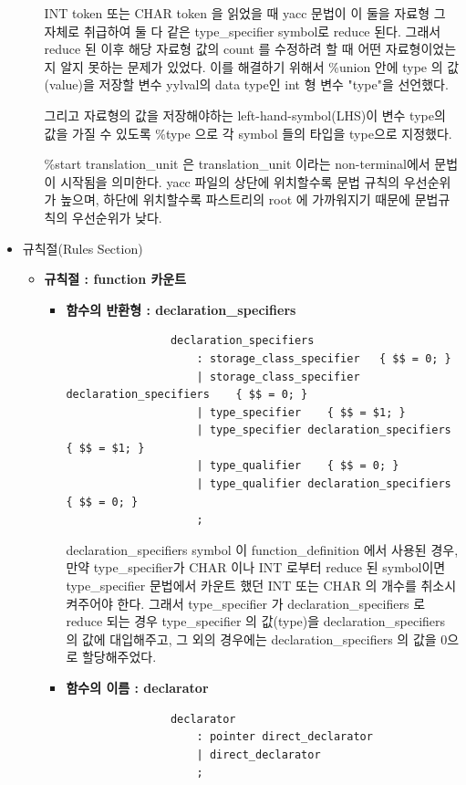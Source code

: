 \documentclass{article}
\begin{document}
\begin{itemize}
\begin{itemize}
		\vspace{3mm}
		INT token 또는 CHAR token 을 읽었을 때 yacc 문법이 이 둘을 자료형 그 자체로 취급하여
		둘 다 같은 type\_specifier symbol로 reduce 된다. 그래서 reduce 된 이후 해당 자료형 값의 count 를 수정하려 할 때
		어떤 자료형이었는지 알지 못하는 문제가 있었다. 이를 해결하기 위해서 \%union 안에 type 의 값(value)을 저장할
		변수 yylval의 data type인 int 형 변수 "type"을 선언했다.

		\vspace{3mm}
		그리고 자료형의 값을 저장해야하는 left-hand-symbol(LHS)이 변수 type의 값을 가질 수 있도록
		\%type 으로 각 symbol 들의 타입을 type으로 지정했다.

		\vspace{3mm}
		\%start translation\_unit 은 translation\_unit 이라는 non-terminal에서 문법이 시작됨을 의미한다.
		yacc 파일의 상단에 위치할수록 문법 규칙의 우선순위가 높으며, 하단에 위치할수록 파스트리의 root 에 가까워지기
		때문에 문법규칙의 우선순위가 낮다.
	\end{itemize}

	\item 규칙절(Rules Section)	
	\begin{itemize}
		\item {\bf 규칙절 : function 카운트}
		\begin{itemize}
			\item {\bf 함수의 반환형 : declaration\_specifiers}
			\begin{lstlisting}
				declaration_specifiers
					: storage_class_specifier	{ $$ = 0; }
					| storage_class_specifier declaration_specifiers	{ $$ = 0; }
					| type_specifier	{ $$ = $1; }
					| type_specifier declaration_specifiers	{ $$ = $1; }
					| type_qualifier	{ $$ = 0; }
					| type_qualifier declaration_specifiers	{ $$ = 0; }
					;
			\end{lstlisting}
			declaration\_specifiers symbol 이 function\_definition 에서 사용된 경우,
			만약 type\_specifier가 CHAR 이나 INT 로부터 reduce 된 symbol이면 type\_specifier
			문법에서 카운트 했던 INT 또는 CHAR 의 개수를 취소시켜주어야 한다. 그래서 type\_specifier 가
			declaration\_specifiers 로 reduce 되는 경우 type\_specifier 의 값(type)을
			declaration\_specifiers 의 값에 대입해주고, 그 외의 경우에는 declaration\_specifiers 의 값을
			0으로 할당해주었다.

			\item {\bf 함수의 이름 : declarator}
			\begin{lstlisting}
				declarator
					: pointer direct_declarator
					| direct_declarator
					;


\end{lstlisting}
\end{itemize}
\end{itemize}
\end{itemize}
\end{document}
